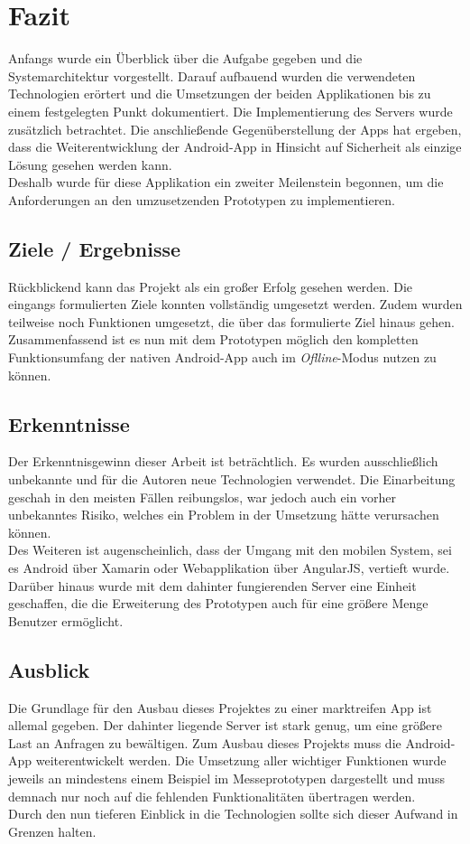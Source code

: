 \chapter{Fazit}
\label{fazit}
Anfangs wurde ein Überblick über die Aufgabe gegeben und die Systemarchitektur vorgestellt. Darauf aufbauend wurden die verwendeten Technologien erörtert und die Umsetzungen der beiden Applikationen bis zu einem festgelegten Punkt dokumentiert. Die Implementierung des Servers wurde zusätzlich betrachtet. Die anschließende Gegenüberstellung der Apps hat ergeben, dass die Weiterentwicklung der Android-App in Hinsicht auf Sicherheit als einzige Lösung gesehen werden kann.\\
Deshalb wurde für diese Applikation ein zweiter Meilenstein begonnen, um die Anforderungen an den umzusetzenden Prototypen zu implementieren. 

\section{Ziele / Ergebnisse}
\label{sec:ziele-ergebnisse}
Rückblickend kann das Projekt als ein großer Erfolg gesehen werden. Die eingangs formulierten Ziele konnten vollständig umgesetzt werden. Zudem wurden teilweise noch Funktionen umgesetzt, die über das formulierte Ziel hinaus gehen.\\
Zusammenfassend ist es nun mit dem Prototypen möglich den kompletten Funktionsumfang der nativen Android-App auch im \textit{Oflline}-Modus nutzen zu können. 

\section{Erkenntnisse}
\label{sec:erkenntnisse}
Der Erkenntnisgewinn dieser Arbeit ist beträchtlich. Es wurden ausschließlich unbekannte und für die Autoren neue Technologien verwendet. Die Einarbeitung geschah in den meisten Fällen reibungslos, war jedoch auch ein vorher unbekanntes Risiko, welches ein Problem in der Umsetzung hätte verursachen können.\\
Des Weiteren ist augenscheinlich, dass der Umgang mit den mobilen System, sei es Android über Xamarin oder Webapplikation über AngularJS, vertieft wurde. Darüber hinaus wurde mit dem dahinter fungierenden Server eine Einheit geschaffen, die die Erweiterung des Prototypen auch für eine größere Menge Benutzer ermöglicht.
\section{Ausblick}
\label{sec:ausblick}
Die Grundlage für den Ausbau dieses Projektes zu einer marktreifen App ist allemal gegeben. Der dahinter liegende Server ist stark genug, um eine größere Last an Anfragen zu bewältigen. Zum Ausbau dieses Projekts muss die Android-App weiterentwickelt werden. Die Umsetzung aller wichtiger Funktionen wurde jeweils an mindestens einem Beispiel im Messeprototypen dargestellt und muss demnach nur noch auf die fehlenden Funktionalitäten übertragen werden.\\
Durch den nun tieferen Einblick in die Technologien sollte sich dieser Aufwand in Grenzen halten.